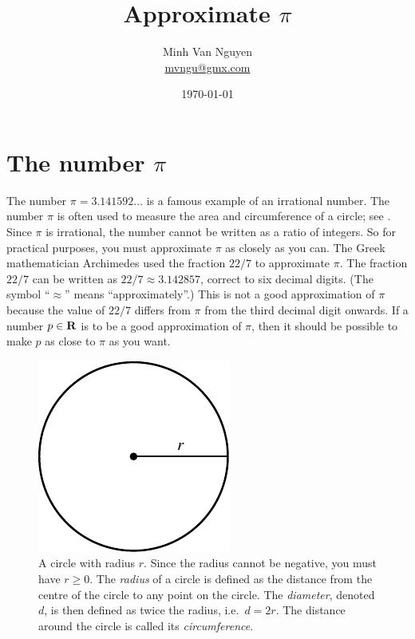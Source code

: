 \documentclass[a4paper,oneside,12pt]{article}
\begin{document}
\title{\Large\bf Approximate $\pi$}
\author{%
  Minh Van Nguyen \\
  \url{mvngu@gmx.com}
}
\date{\today}
\maketitle



\section{The number $\pi$}

The number $\pi = 3.141592\dots$ is a famous example of an irrational
number.  The number $\pi$ is often used to measure the area and
circumference of a circle; see .  Since
$\pi$ is irrational, the number cannot be written as a ratio of
integers.  So for practical purposes, you must approximate $\pi$ as
closely as you can.  The Greek mathematician Archimedes used the
fraction $22 / 7$ to approximate $\pi$.  The fraction $22 / 7$ can be
written as $22 / 7 \approx 3.142857$, correct to six decimal digits.
(The symbol ``$\approx$'' means ``approximately''.)  This is not a
good approximation of $\pi$ because the value of $22 / 7$ differs from
$\pi$ from the third decimal digit onwards.  If a number $p \in \mathbf{R}$
is to be a good approximation of $\pi$, then it should be possible to
make $p$ as close to $\pi$ as you want.

\begin{figure}[!htbp]
\centering
\includegraphics[scale=1]{image/05/circle.pdf}
\caption{%
  A circle with radius $r$.  Since the radius cannot be negative, you
  must have $r \geq 0$.  The \emph{radius} of a circle is defined as
  the distance from the centre of the circle to any point on the
  circle.  The \emph{diameter}, denoted $d$, is then defined as twice
  the radius, i.e.~$d = 2r$.  The distance around the circle is called
  its \emph{circumference}.
}
\label{fig:general_circle}
\end{figure}
\end{document}
